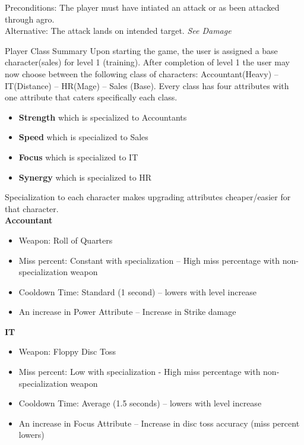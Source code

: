 \documentclass{report}
\begin{document}
    Preconditions: The player must have intiated an attack or as been attacked through agro.\\
    Alternative: The attack lands on intended target. \textit{See Damage}
\begin{chapter}{Player Class Summary}
 Upon starting the game, the user is assigned a base character(sales) for level 1 (training). After completion of level 1 the user may now choose between the following class of characters: Accountant(Heavy) -- IT(Distance) -- HR(Mage) -- Sales (Base).  Every class has four attributes with one attribute that caters specifically each class.\\ 
\begin{itemize}
\item \textbf{Strength} which is specialized to Accountants\\ 
\item \textbf{Speed} which is specialized to Sales\\ 
\item \textbf{Focus} which is specialized to IT\\ 
\item \textbf{Synergy} which is specialized to HR\\  
\end{itemize}
Specialization to each character makes upgrading attributes cheaper/easier for that character.\\

\textbf{\large{Accountant}}
\begin{itemize}
  \item Weapon: Roll of Quarters
  \item Miss percent: Constant with specialization -- High miss percentage with non-specialization weapon
  \item Cooldown Time: Standard (1 second) -- lowers with level increase %
  \item An increase in Power Attribute -- Increase in Strike damage \\
\end{itemize}

\textbf{\large{IT}} 
\begin{itemize}
  \item Weapon: Floppy Disc Toss
  \item Miss percent: Low with specialization - High miss percentage with non-specialization weapon
  \item Cooldown Time: Average (1.5 seconds) -- lowers with level increase
  \item An increase in Focus Attribute -- Increase in disc toss accuracy (miss percent lowers)\\
\end{itemize}


\end{chapter}
\end{document}
